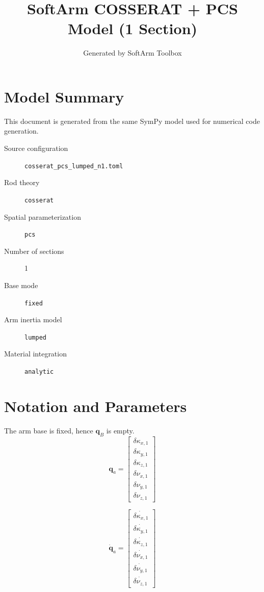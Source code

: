 \documentclass[11pt]{article}
\title{SoftArm COSSERAT + PCS Model (1 Section)}
\author{Generated by SoftArm Toolbox}
\date{}
\begin{document}
\maketitle

\section{Model Summary}
This document is generated from the same SymPy model used for numerical code generation.
\begin{description}
\item[Source configuration] \texttt{cosserat\_pcs\_lumped\_n1.toml}
\item[Rod theory] \texttt{cosserat}
\item[Spatial parameterization] \texttt{pcs}
\item[Number of sections] 1
\item[Base mode] \texttt{fixed}
\item[Arm inertia model] \texttt{lumped}
\item[Material integration] \texttt{analytic}
\end{description}

\section{Notation and Parameters}
The arm base is fixed, hence $\boldsymbol q_B$ is empty.
\begin{equation}
\boldsymbol q_a=\begin{bmatrix}\delta\kappa_{x,1}\\\delta\kappa_{y,1}\\\delta\kappa_{z,1}\\\delta\nu_{x,1}\\\delta\nu_{y,1}\\\delta\nu_{z,1}\end{bmatrix}
\end{equation}

\begin{equation}
\dot{\boldsymbol q}_a=\begin{bmatrix}\dot{\delta\kappa_{x,1}}\\\dot{\delta\kappa_{y,1}}\\\dot{\delta\kappa_{z,1}}\\\dot{\delta\nu_{x,1}}\\\dot{\delta\nu_{y,1}}\\\dot{\delta\nu_{z,1}}\end{bmatrix}
\end{equation}
\end{document}
